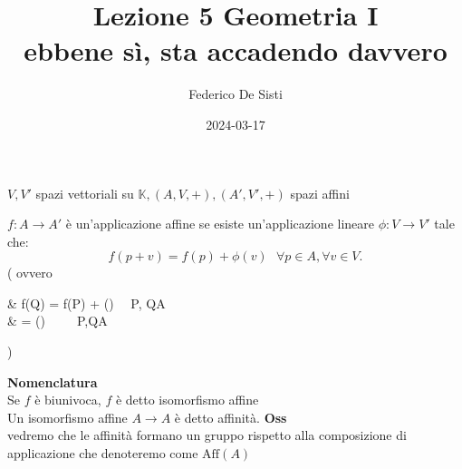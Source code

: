 \documentclass[12px]{article}
\title{Lezione 5 Geometria I \\
\large ebbene sì, sta accadendo davvero}
\date{2024-03-17}
\author{Federico De Sisti}
\begin{document}
\maketitle
\newpage
$V, V'$ spazi vettoriali su $\mathbb{K}, (A,V,+), (A',V',+)$ spazi affini\\
\begin{defi}
	$f:A\rightarrow A'$ è un'applicazione affine se esiste un'applicazione lineare $\phi :V\rightarrow V'$ tale che:  \[
	f(p + v) = f(p) + \phi (v) \ \ \ \forall p\in A, \forall v\in V
	.\]
	\left( ovvero \  \ \ 
		\begin{aligned}
		& f(Q) = f(P) + \phi() \ \ \forall P, Q\in A \\ 
		&  = \phi(\overrightarrow{PQ})\ \ \ \ \   \forall P,Q\in A \\ 
	\end{aligned}
\right)
\end{defi}
\textbf{Nomenclatura}\\
Se $f$ è biunivoca, $f$ è detto isomorfismo affine\\
Un isomorfismo affine $A\rightarrow A$ è detto affinità.
\textbf{Oss}\\
vedremo che le affinità formano un gruppo rispetto alla composizione di applicazione che denoteremo come $\text{Aff}(A)$\\
\end{document}
